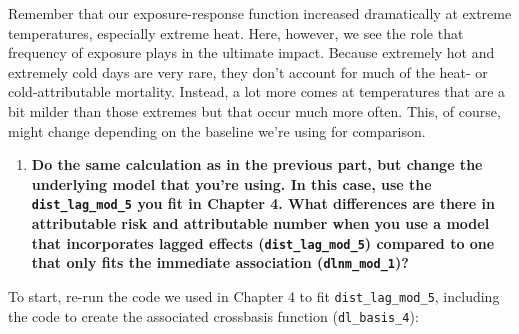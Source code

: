 \documentclass[
]{book}
\newenvironment{Shaded}{\begin{snugshade}}{\end{snugshade}}
\newcommand{\AttributeTok}[1]{\textcolor[rgb]{0.77,0.63,0.00}{#1}}
\newcommand{\ConstantTok}[1]{\textcolor[rgb]{0.00,0.00,0.00}{#1}}
\newcommand{\DecValTok}[1]{\textcolor[rgb]{0.00,0.00,0.81}{#1}}
\newcommand{\FunctionTok}[1]{\textcolor[rgb]{0.00,0.00,0.00}{#1}}
\newcommand{\NormalTok}[1]{#1}
\newcommand{\OtherTok}[1]{\textcolor[rgb]{0.56,0.35,0.01}{#1}}
\newcommand{\SpecialCharTok}[1]{\textcolor[rgb]{0.00,0.00,0.00}{#1}}
\newcommand{\StringTok}[1]{\textcolor[rgb]{0.31,0.60,0.02}{#1}}
\providecommand{\tightlist}{%
  \setlength{\itemsep}{0pt}\setlength{\parskip}{0pt}}
\begin{document}
Remember that our exposure-response function increased dramatically at extreme temperatures, especially extreme heat. Here, however, we see the role that frequency of exposure plays in the ultimate impact. Because extremely hot and extremely cold days are very rare, they don't account for much of the heat- or cold-attributable mortality. Instead, a lot more comes at temperatures that are a bit milder than those extremes but that occur much more often. This, of course, might change depending on the baseline we're using for comparison.

\begin{enumerate}
\def\labelenumi{\arabic{enumi}.}
\setcounter{enumi}{2}
\tightlist
\item
  \textbf{Do the same calculation as in the previous part, but change the underlying model that you're using. In this case, use the \texttt{dist\_lag\_mod\_5} you fit in Chapter 4. What differences are there in attributable risk and attributable number when you use a model that incorporates lagged effects (\texttt{dist\_lag\_mod\_5}) compared to one that only fits the immediate association (\texttt{dlnm\_mod\_1})?}
\end{enumerate}

To start, re-run the code we used in Chapter 4 to fit \texttt{dist\_lag\_mod\_5}, including the code to create the associated crossbasis function (\texttt{dl\_basis\_4}):

\begin{Shaded}
\end{Shaded}
\end{document}
